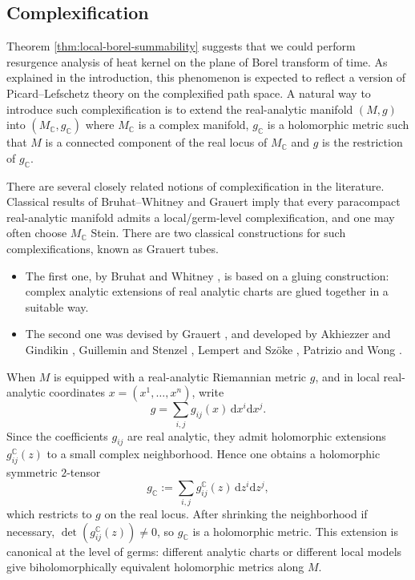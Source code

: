\documentclass[11pt]{amsart}
\theoremstyle{plain}
\theoremstyle{definition}
\newcommand{\C}{\mathbb{C}}
\newcommand{\dd}{\mathrm d}
\begin{document}
\subsection{Complexification}\label{sec: complexification}

Theorem \ref{thm:local-borel-summability} suggests that we could perform resurgence analysis of heat kernel on the plane of Borel transform of time. As explained in the introduction, this phenomenon is expected to reflect a version of Picard–Lefschetz theory on the complexified path space. A natural way to introduce such complexification is to extend the real-analytic manifold $(M,g)$ into $(M_\C,g_{\C})$ where $M_{\C}$ is a complex manifold, $g_{\C}$ is a holomorphic metric such that $M$ is a connected component of the real locus of $M_{\C}$ and $g$ is the restriction of $g_{\C}$. 



There are several closely related notions of complexification in the literature. Classical results of Bruhat--Whitney and Grauert imply that every paracompact real-analytic manifold admits a local/germ-level complexification, and one may often choose $M_{\C}$ Stein. There are two classical constructions for such complexifications, known as Grauert tubes. 
\begin{itemize}
\item[(1)] The first one, by Bruhat and Whitney \cite{BW}, is based on a gluing construction: complex analytic extensions of real analytic charts are glued together in a suitable way. 
\item[(2)] The second one was devised by Grauert \cite{Gr}, and developed by Akhiezzer and Gindikin \cite{AG}, Guillemin and Stenzel \cite{GS}, Lempert and Sz\"oke \cite{LS,Sz}, Patrizio and Wong \cite{PW}.
\end{itemize}



When $M$ is equipped with a real-analytic Riemannian metric $g$, and in local real-analytic coordinates $x=(x^1,\dots,x^n)$, write
\[
g=\sum_{i,j} g_{ij}(x)\,\dd x^i\dd x^j.
\]
Since the coefficients $g_{ij}$ are real analytic, they admit holomorphic extensions $g_{ij}^{\C}(z)$ to a small complex neighborhood. Hence one obtains a holomorphic symmetric $2$-tensor
\[
g_{\C}:=\sum_{i,j} g_{ij}^{\C}(z)\,\dd z^i\dd z^j ,
\]
which restricts to $g$ on the real locus. After shrinking the neighborhood if necessary, $\det(g_{ij}^{\C}(z))\neq 0$, so $g_{\C}$ is a holomorphic metric. This extension is canonical at the level of germs: different analytic charts or different local models give biholomorphically equivalent holomorphic metrics along $M$.
\end{document}

